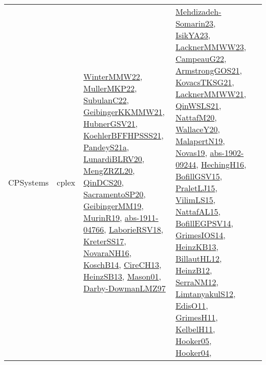 {\begin{longtable}{llp{6cm}p{6cm}p{6cm}}
CPSystems & cplex & \href{papers/WinterMMW22.pdf}{WinterMMW22}\cite{WinterMMW22}, \href{articles/MullerMKP22.pdf}{MullerMKP22}\cite{MullerMKP22}, \href{articles/SubulanC22.pdf}{SubulanC22}\cite{SubulanC22}, \href{papers/GeibingerKKMMW21.pdf}{GeibingerKKMMW21}\cite{GeibingerKKMMW21}, \href{articles/HubnerGSV21.pdf}{HubnerGSV21}\cite{HubnerGSV21}, \href{articles/KoehlerBFFHPSSS21.pdf}{KoehlerBFFHPSSS21}\cite{KoehlerBFFHPSSS21}, \href{articles/PandeyS21a.pdf}{PandeyS21a}\cite{PandeyS21a}, \href{articles/LunardiBLRV20.pdf}{LunardiBLRV20}\cite{LunardiBLRV20}, \href{articles/MengZRZL20.pdf}{MengZRZL20}\cite{MengZRZL20}, \href{articles/QinDCS20.pdf}{QinDCS20}\cite{QinDCS20}, \href{articles/SacramentoSP20.pdf}{SacramentoSP20}\cite{SacramentoSP20}, \href{papers/GeibingerMM19.pdf}{GeibingerMM19}\cite{GeibingerMM19}, \href{papers/MurinR19.pdf}{MurinR19}\cite{MurinR19}, \href{articles/abs-1911-04766.pdf}{abs-1911-04766}\cite{abs-1911-04766}, \href{articles/LaborieRSV18.pdf}{LaborieRSV18}\cite{LaborieRSV18}, \href{articles/KreterSS17.pdf}{KreterSS17}\cite{KreterSS17}, \href{articles/NovaraNH16.pdf}{NovaraNH16}\cite{NovaraNH16}, \href{papers/KoschB14.pdf}{KoschB14}\cite{KoschB14}, \href{papers/CireCH13.pdf}{CireCH13}\cite{CireCH13}, \href{articles/HeinzSB13.pdf}{HeinzSB13}\cite{HeinzSB13}, \href{articles/Mason01.pdf}{Mason01}\cite{Mason01}, \href{articles/Darby-DowmanLMZ97.pdf}{Darby-DowmanLMZ97}\cite{Darby-DowmanLMZ97} & \href{papers/Mehdizadeh-Somarin23.pdf}{Mehdizadeh-Somarin23}\cite{Mehdizadeh-Somarin23}, \href{articles/IsikYA23.pdf}{IsikYA23}\cite{IsikYA23}, \href{articles/LacknerMMWW23.pdf}{LacknerMMWW23}\cite{LacknerMMWW23}, \href{articles/CampeauG22.pdf}{CampeauG22}\cite{CampeauG22}, \href{papers/ArmstrongGOS21.pdf}{ArmstrongGOS21}\cite{ArmstrongGOS21}, \href{papers/KovacsTKSG21.pdf}{KovacsTKSG21}\cite{KovacsTKSG21}, \href{papers/LacknerMMWW21.pdf}{LacknerMMWW21}\cite{LacknerMMWW21}, \href{articles/QinWSLS21.pdf}{QinWSLS21}\cite{QinWSLS21}, \href{papers/NattafM20.pdf}{NattafM20}\cite{NattafM20}, \href{articles/WallaceY20.pdf}{WallaceY20}\cite{WallaceY20}, \href{papers/MalapertN19.pdf}{MalapertN19}\cite{MalapertN19}, \href{articles/Novas19.pdf}{Novas19}\cite{Novas19}, \href{articles/abs-1902-09244.pdf}{abs-1902-09244}\cite{abs-1902-09244}, \href{papers/HechingH16.pdf}{HechingH16}\cite{HechingH16}, \href{papers/BofillGSV15.pdf}{BofillGSV15}\cite{BofillGSV15}, \href{papers/PraletLJ15.pdf}{PraletLJ15}\cite{PraletLJ15}, \href{papers/VilimLS15.pdf}{VilimLS15}\cite{VilimLS15}, \href{articles/NattafAL15.pdf}{NattafAL15}\cite{NattafAL15}, \href{papers/BofillEGPSV14.pdf}{BofillEGPSV14}\cite{BofillEGPSV14}, \href{articles/GrimesIOS14.pdf}{GrimesIOS14}\cite{GrimesIOS14}, \href{papers/HeinzKB13.pdf}{HeinzKB13}\cite{HeinzKB13}, \href{papers/BillautHL12.pdf}{BillautHL12}\cite{BillautHL12}, \href{papers/HeinzB12.pdf}{HeinzB12}\cite{HeinzB12}, \href{papers/SerraNM12.pdf}{SerraNM12}\cite{SerraNM12}, \href{articles/LimtanyakulS12.pdf}{LimtanyakulS12}\cite{LimtanyakulS12}, \href{papers/EdisO11.pdf}{EdisO11}\cite{EdisO11}, \href{papers/GrimesH11.pdf}{GrimesH11}\cite{GrimesH11}, \href{articles/KelbelH11.pdf}{KelbelH11}\cite{KelbelH11}, \href{articles/Hooker05.pdf}{Hooker05}\cite{Hooker05}, \href{papers/Hooker04.pdf}{Hooker04}\cite{Hooker04}, 
\end{longtable}}
